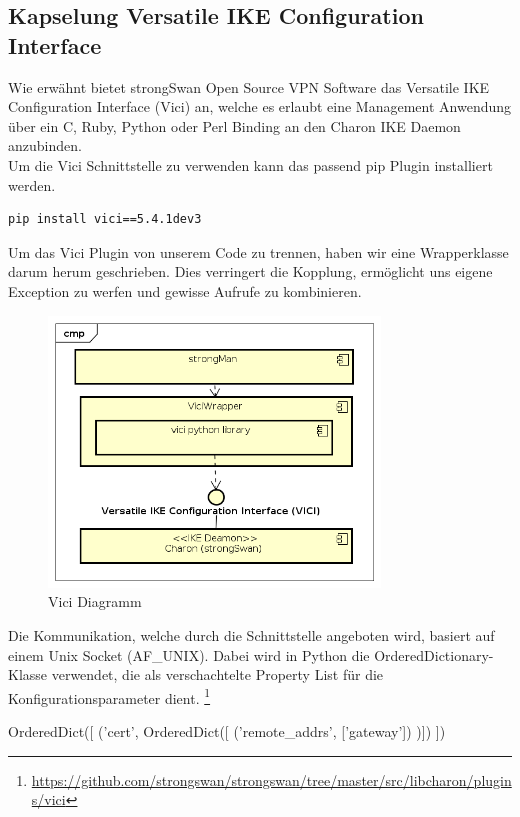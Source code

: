 \subsection{Kapselung Versatile IKE Configuration Interface}
Wie erwähnt bietet strongSwan Open Source VPN Software das Versatile
IKE Configuration Interface (Vici) \cite{vici} an, welche es erlaubt eine Management Anwendung über ein C, Ruby, Python oder Perl Binding an den Charon
IKE Daemon anzubinden.\\
Um die Vici Schnittstelle zu verwenden kann das passend pip Plugin installiert werden.
\\
\begin{lstlisting}[style=BashInputStyle]
	pip install vici==5.4.1dev3
\end{lstlisting}
\medskip
Um das Vici Plugin von unserem Code zu trennen, haben wir eine Wrapperklasse darum herum geschrieben. Dies verringert die Kopplung, ermöglicht uns eigene Exception zu werfen und gewisse Aufrufe zu kombinieren. \\
\begin{figure}[H]
\centering
\includegraphics[width=250pt]{images/vici_wrapper.png}
\caption[Vici Diagramm]{Vici Diagramm}
\end{figure}
\medskip
Die Kommunikation, welche durch die Schnittstelle angeboten wird, basiert auf einem Unix Socket (AF\_UNIX). Dabei wird in Python die OrderedDictionary-Klasse verwendet, die als verschachtelte Property List für die Konfigurationsparameter dient. \footnote{\url{https://github.com/strongswan/strongswan/tree/master/src/libcharon/plugins/vici}}\\

\begin{python}
OrderedDict([
	('cert', OrderedDict([
		('remote_addrs', ['gateway'])
	)])
])
\end{python}
